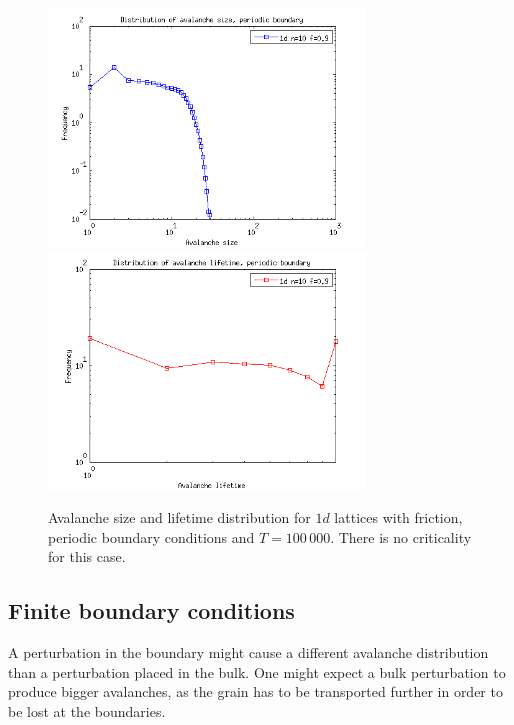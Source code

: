 \begin{figure}
\begin{center}
\includegraphics[width=0.75\textwidth]{results/1sp.png}
\includegraphics[width=0.75\textwidth]{results/1tp.png}
\caption{Avalanche size and lifetime distribution for $1d$ lattices with friction, periodic boundary conditions and $T=100\,000$. There is no criticality for this case. }
\label{1p}
\end{center}
\end{figure} 










\subsection{Finite boundary conditions}

A perturbation in the boundary might cause a different avalanche distribution than a perturbation placed in the bulk. One might expect a bulk perturbation to produce bigger avalanches, as the grain has to be transported further in order to be lost at the boundaries.

